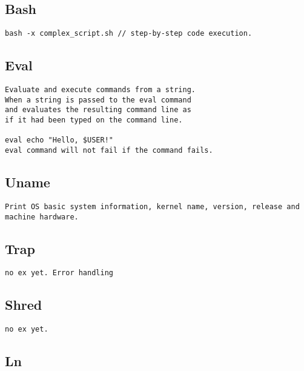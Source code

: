 \subsection{Bash}

\begin{verbatim}
bash -x complex_script.sh // step-by-step code execution. 
\end{verbatim}

\subsection{Eval}

\begin{verbatim}
Evaluate and execute commands from a string. 
When a string is passed to the eval command
and evaluates the resulting command line as
if it had been typed on the command line.

eval echo "Hello, $USER!"
eval command will not fail if the command fails.  
\end{verbatim}

\subsection{Uname}

\begin{verbatim}
Print OS basic system information, kernel name, version, release and machine hardware. 
\end{verbatim}

\subsection{Trap}

\begin{verbatim}
no ex yet. Error handling
\end{verbatim}

\subsection{Shred}

\begin{verbatim}
no ex yet.
\end{verbatim}

\subsection{Ln}

